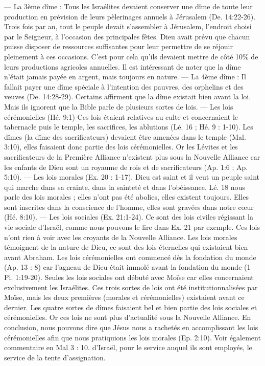 \begin{multicols}{2}
{— La 3ème dîme : Tous les Israélites devaient conserver une dîme de toute leur production en prévision de leurs pèlerinages annuels à Jérusalem (De. 14:22-26).
Trois fois par an, tout le peuple devait s'assembler à Jérusalem, l'endroit choisi par le Seigneur, à l'occasion des principales fêtes. Dieu avait prévu que chacun puisse disposer de ressources suffisantes pour leur permettre de se réjouir pleinement à ces occasions. C'est pour cela qu'ils devaient mettre de côté 10\% de leurs productions agricoles annuelles. Il est intéressant de noter que la dîme n'était jamais payée en argent, mais toujours en nature.
— La 4ème dîme : Il fallait payer une dîme spéciale à l'intention des pauvres, des orphelins et des veuves (De. 14:28-29). 
Certains affirment que la dîme existait bien avant la loi. Mais ils ignorent que la Bible parle de plusieurs sortes de lois.
— Les lois cérémonielles (Hé. 9:1)
Ces lois étaient relatives au culte et concernaient le tabernacle puis le temple, les sacrifices, les ablutions (Lé. 16 ; Hé. 9 : 1-10). Les dîmes (la dîme des sacrificateurs) devaient être amenées dans le temple (Mal. 3:10), elles faisaient donc partie des lois cérémonielles. Or les Lévites et les sacrificateurs de la Première Alliance n'existent plus sous la Nouvelle Alliance car les enfants de Dieu sont un royaume de rois et de sacrificateurs (Ap. 1:6 ; Ap. 5:10).
— Les lois morales (Ex. 20 : 1-17). Dieu est saint et il veut un peuple saint qui marche dans sa crainte, dans la sainteté et dans l'obéissance. Lé. 18 nous parle des lois morales ; elles n'ont pas été abolies, elles existent toujours. Elles sont inscrites dans la conscience de l'homme, elles sont gravées dans notre cœur (Hé. 8:10).
— Les lois sociales (Ex. 21:1-24). Ce sont des lois civiles régissant la vie sociale d'Israël, comme nous pouvons le lire dans Ex. 21 par exemple. Ces lois n'ont rien à voir avec les croyants de la Nouvelle Alliance. Les lois morales témoignent de la nature de Dieu, ce sont des lois éternelles qui existaient bien avant Abraham. Les lois cérémonielles ont commencé dès la fondation du monde (Ap. 13 : 8) car l'agneau de Dieu était immolé avant la fondation du monde (1 Pi. 1:19-20). Seules les lois sociales ont débuté avec Moïse car elles concernaient exclusivement les Israélites. Ces trois sortes de lois ont été institutionnalisées par Moïse, mais les deux premières (morales et cérémonielles) existaient avant ce dernier. Les quatre sortes de dîmes faisaient bel et bien partie des lois sociales et cérémonielles. Or ces lois ne sont plus d'actualité sous la Nouvelle Alliance. En conclusion, nous pouvons dire que Jésus nous a rachetés en accomplissant les lois cérémonielles afin que nous pratiquions les lois morales (Ep. 2:10). Voir également commentaire en Mal 3 : 10.} d'Israël, pour le service auquel ils sont employés, le service de la tente d'assignation.

\end{multicols}
